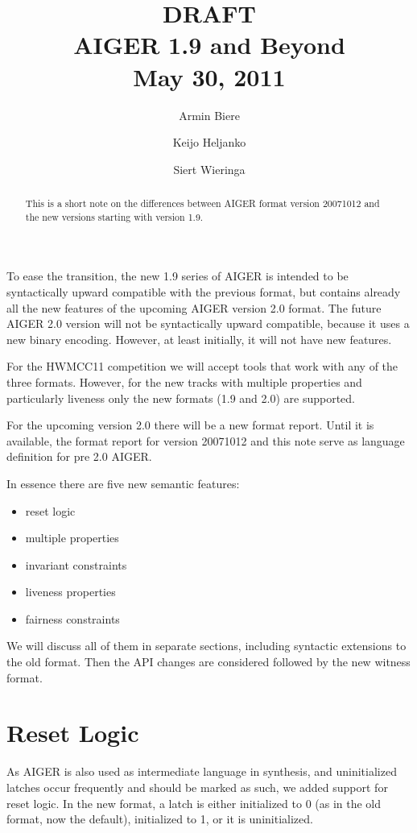 \documentclass{llncs}
\title{
{\color{blue}\large DRAFT}\\
  AIGER 1.9 and Beyond \\
{\color{blue}\large May 30, 2011}}
\author{Armin Biere\inst{1} \and
Keijo Heljanko\inst{2} \and
Siert Wieringa\inst{2}}
\institute{Johannes Kepler University, Austria \and Alto University, Finland}
\begin{document}
\maketitle
\begin{abstract}
This is a short note on the differences between AIGER format version 20071012
and the new versions starting with version 1.9.
\end{abstract}
To ease the transition, the new 1.9 series of AIGER is intended to be
syntactically upward compatible with the previous format, but contains
already all the new features of the upcoming AIGER version 2.0 format.  The
future AIGER 2.0 version will not be syntactically upward compatible, because
it uses a new binary encoding.  However, at least initially, it will not have
new features.

For the HWMCC11 competition we will accept tools that work with any of
the three formats.  However, for the new tracks with multiple properties and 
particularly liveness only the new formats (1.9 and 2.0) are supported.

For the upcoming version 2.0 there will be a new format report. Until it is
available, the format report for version 20071012 and this note serve as
language definition for pre 2.0 AIGER.  

In essence there are five new semantic features:

\begin{itemize}
\item reset logic
\item multiple properties
\item invariant constraints
\item liveness properties
\item fairness constraints
\end{itemize}

We will discuss all of them in separate sections, including syntactic
extensions to the old format.   Then the API changes are considered followed
by the new witness format.

\section{Reset Logic}

As AIGER is also used as intermediate language in synthesis, and
uninitialized latches occur frequently and should be marked as such, we
added support for reset logic.  In the new format, a latch is either
initialized to 0 (as in the old format, now the default), initialized to 1,
or it is uninitialized.
\end{document}
